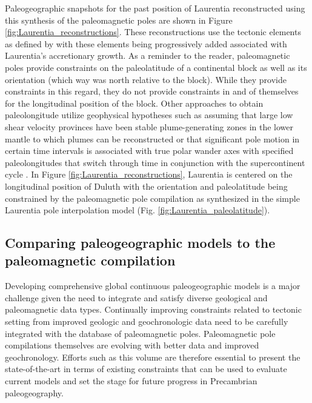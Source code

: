 \documentclass[11pt,letterpaper]{article}
\begin{document}
Paleogeographic snapshots for the past position of Laurentia reconstructed using this synthesis of the paleomagnetic poles are shown in Figure \ref{fig:Laurentia_reconstructions}. These reconstructions use the tectonic elements as defined by \citet{Whitmeyer2007a} with these elements being progressively added associated with Laurentia's accretionary growth. As a reminder to the reader, paleomagnetic poles provide constraints on the paleolatitude of a continental block as well as its orientation (which way was north relative to the block). While they provide constraints in this regard, they do not provide constraints in and of themselves for the longitudinal position of the block. Other approaches to obtain paleolongitude utilize geophysical hypotheses such as assuming that large low shear velocity provinces have been stable plume-generating zones in the lower mantle to which plumes can be reconstructed \citep{Torsvik2014a} or that significant pole motion in certain time intervals is associated with true polar wander axes with specified paleolongitudes that switch through time in conjunction with the supercontinent cycle \citep{Mitchell2012a}. In Figure \ref{fig:Laurentia_reconstructions}, Laurentia is centered on the longitudinal position of Duluth with the orientation and paleolatitude being constrained by the paleomagnetic pole compilation as synthesized in the simple Laurentia pole interpolation model (Fig. \ref{fig:Laurentia_paleolatitude}).

\subsection{Comparing paleogeographic models to the paleomagnetic compilation}

Developing comprehensive global continuous paleogeographic models is a major challenge given the need to integrate and satisfy diverse geological and paleomagnetic data types. Continually improving constraints related to tectonic setting from improved geologic and geochronologic data need to be carefully integrated with the database of paleomagnetic poles. Paleomagnetic pole compilations themselves are evolving with better data and improved geochronology. Efforts such as this volume are therefore essential to present the state-of-the-art in terms of existing constraints that can be used to evaluate current models and set the stage for future progress in Precambrian paleogeography.
\end{document}
